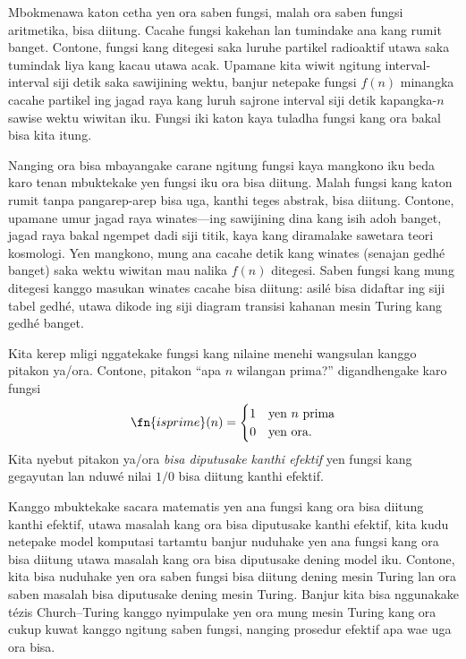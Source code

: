 \documentclass[../../../include/open-logic-section]{subfiles}
\begin{document}

Mbokmenawa katon cetha yen ora saben fungsi, malah
ora saben fungsi aritmetika, bisa diitung. Cacahe
fungsi kakehan lan tumindake ana kang rumit banget.
Contone, fungsi kang ditegesi saka luruhe partikel
radioaktif utawa saka tumindak liya kang kacau utawa
acak. Upamane kita wiwit ngitung interval-interval
siji detik saka sawijining wektu, banjur netepake
fungsi $f(n)$ minangka cacahe partikel ing jagad raya
kang luruh sajrone interval siji detik kapangka-$n$
sawise wektu wiwitan iku. Fungsi iki katon kaya
tuladha fungsi kang ora bakal bisa kita itung.

Nanging ora bisa mbayangake carane ngitung fungsi
kaya mangkono iku beda karo tenan mbuktekake yen
fungsi iku ora bisa diitung. Malah fungsi kang katon
rumit tanpa pangarep-arep bisa uga, kanthi teges
abstrak, bisa diitung. Contone, upamane umur jagad
raya winates---ing sawijining dina kang isih adoh
banget, jagad raya bakal ngempet dadi siji titik,
kaya kang diramalake sawetara teori kosmologi.
Yen mangkono, mung ana cacahe detik kang winates
(senajan gedhé banget) saka wektu wiwitan mau nalika
$f(n)$ ditegesi. Saben fungsi kang mung ditegesi
kanggo masukan winates cacahe bisa diitung: asilé
bisa didaftar ing siji tabel gedhé, utawa dikode
ing siji diagram transisi kahanan mesin Turing
kang gedhé banget.

Kita kerep mligi nggatekake fungsi kang nilaine
menehi wangsulan kanggo pitakon ya/ora. Contone,
pitakon ``apa $n$ wilangan prima?'' digandhengake
karo fungsi
\[
\fn{isprime}(n) = \begin{cases}
  1 & \text{yen $n$ prima}\\
  0 & \text{yen ora.}
  \end{cases}
\]
Kita nyebut pitakon ya/ora \emph{bisa diputusake
kanthi efektif} yen fungsi kang gegayutan lan
nduwé nilai $1/0$ bisa diitung kanthi efektif.

Kanggo mbuktekake sacara matematis yen ana fungsi
kang ora bisa diitung kanthi efektif, utawa masalah
kang ora bisa diputusake kanthi efektif, kita kudu
netepake model komputasi tartamtu banjur nuduhake
yen ana fungsi kang ora bisa diitung utawa masalah
kang ora bisa diputusake dening model iku. Contone,
kita bisa nuduhake yen ora saben fungsi bisa diitung
dening mesin Turing lan ora saben masalah bisa
diputusake dening mesin Turing. Banjur kita bisa
nggunakake tézis Church--Turing kanggo nyimpulake
yen ora mung mesin Turing kang ora cukup kuwat
kanggo ngitung saben fungsi, nanging prosedur
efektif apa wae uga ora bisa.
\end{document}
